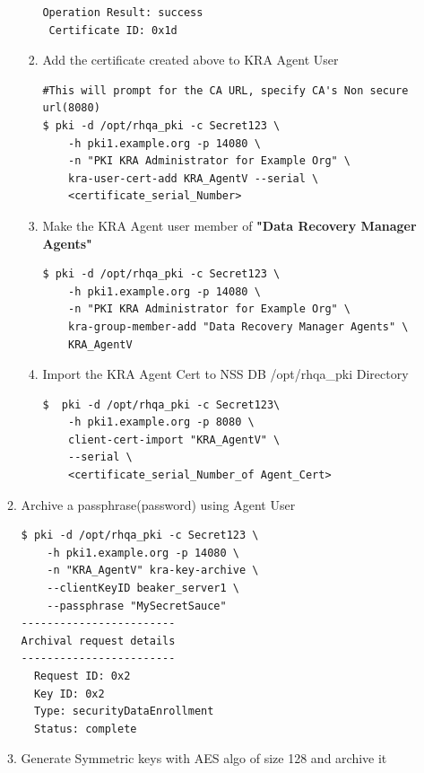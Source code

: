 \documentclass[a4paper]{article}
\begin{document}
\begin{enumerate}[label*=\arabic*.]
\begin{enumerate}[label*=\arabic*.]
\begin{enumerate}[label*=\arabic*.]
\begin{lstlisting}[style=bashInputStyle]
 Operation Result: success
 Certificate ID: 0x1d
                            \end{lstlisting}
                        \item Add the certificate created above to KRA Agent User
                            \begin{lstlisting}[style=bashInputStyle]
#This will prompt for the CA URL, specify CA's Non secure url(8080)                            
$ pki -d /opt/rhqa_pki -c Secret123 \
    -h pki1.example.org -p 14080 \
    -n "PKI KRA Administrator for Example Org" \
    kra-user-cert-add KRA_AgentV --serial \
    <certificate_serial_Number>
                            \end{lstlisting}
                        \item Make the KRA Agent user member of \textbf{"Data Recovery Manager Agents"}
                            \begin{lstlisting}[style=bashInputStyle]
$ pki -d /opt/rhqa_pki -c Secret123 \
    -h pki1.example.org -p 14080 \
    -n "PKI KRA Administrator for Example Org" \
    kra-group-member-add "Data Recovery Manager Agents" \
    KRA_AgentV
                            \end{lstlisting}
                        \item Import the KRA Agent Cert to NSS DB /opt/rhqa\_pki Directory
                            \begin{lstlisting}[style=bashInputStyle]
$  pki -d /opt/rhqa_pki -c Secret123\
    -h pki1.example.org -p 8080 \
    client-cert-import "KRA_AgentV" \
    --serial \
    <certificate_serial_Number_of Agent_Cert>
                            \end{lstlisting}
                    \end{enumerate}
                \item \label{arch_password}  Archive a passphrase(password) using Agent User
                    \begin{lstlisting}[style=bashInputStyle]
$ pki -d /opt/rhqa_pki -c Secret123 \
    -h pki1.example.org -p 14080 \
    -n "KRA_AgentV" kra-key-archive \
    --clientKeyID beaker_server1 \
    --passphrase "MySecretSauce"
------------------------
Archival request details
------------------------
  Request ID: 0x2
  Key ID: 0x2
  Type: securityDataEnrollment
  Status: complete
                    \end{lstlisting}
                \item \label{arch_symmetric} Generate Symmetric keys with AES algo of size 128 and archive it

\end{enumerate}
\end{enumerate}
\end{document}
